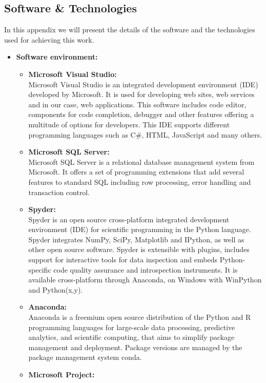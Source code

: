 \begin{appendix}
\chapter{Software \& Technologies}
In this appendix we will present the details of the software and the technologies used for achieving this
work.

\begin{itemize}
\item \textbf{Software environment:}
\begin{itemize}
\item \textbf{Microsoft Visual Studio:}\\
Microsoft Visual Studio is an integrated development environment (IDE) developed by Microsoft. It is
used for developing web sites, web services and in our case, web applications.
This software includes code editor, components for code completion, debugger and other features
offering a multitude of options for developers. This IDE supports different programming languages
such as C\#, HTML, JavaScript and many others.
\item \textbf{Microsoft SQL Server:}\\
Microsoft SQL Server is a relational database management system from Microsoft. It offers a set of programming extensions that add several features to standard SQL including row processing,
error handling and transaction control.
\item \textbf{Spyder:}\\
Spyder is an open source cross-platform integrated development environment (IDE) for scientific programming in the Python language. Spyder integrates NumPy, SciPy, Matplotlib and IPython, as well as other open source software. Spyder is extensible with plugins, includes support for interactive tools for data inspection and embeds Python-specific code quality assurance and introspection instruments. It is available cross-platform through Anaconda, on Windows with WinPython and Python(x,y).
\item \textbf{Anaconda:}\\
Anaconda is a freemium open source distribution of the Python and R programming languages for large-scale data processing, predictive analytics, and scientific computing, that aims to simplify package management and deployment. Package versions are managed by the package management system conda.
\item \textbf{Microsoft Project:}\\

\end{itemize}
\end{itemize}
\end{appendix}
